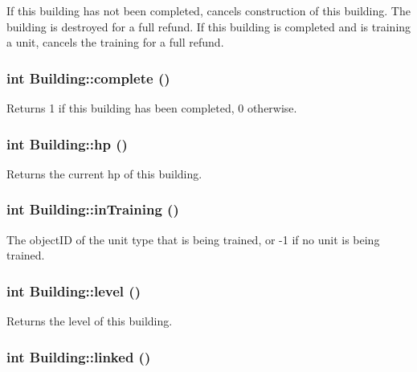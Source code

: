 If this building has not been completed, cancels construction of this building. The building is destroyed for a full refund. If this building is completed and is training a unit, cancels the training for a full refund. \hypertarget{classBuilding_857556a454fae63573429c3de4fcaf31}{
\subsubsection[{complete}]{\setlength{\rightskip}{0pt plus 5cm}int Building::complete ()}}
\label{classBuilding_857556a454fae63573429c3de4fcaf31}


Returns 1 if this building has been completed, 0 otherwise. \hypertarget{classBuilding_48f667674e858a00faf79d46e43335bd}{
\subsubsection[{hp}]{\setlength{\rightskip}{0pt plus 5cm}int Building::hp ()}}
\label{classBuilding_48f667674e858a00faf79d46e43335bd}


Returns the current hp of this building. \hypertarget{classBuilding_a30937bcf69dd4b8f7ce30c4536f1886}{
\subsubsection[{inTraining}]{\setlength{\rightskip}{0pt plus 5cm}int Building::inTraining ()}}
\label{classBuilding_a30937bcf69dd4b8f7ce30c4536f1886}


The objectID of the unit type that is being trained, or -1 if no unit is being trained. \hypertarget{classBuilding_e16eed2b0497af6c2629cf3cb1823c5d}{
\subsubsection[{level}]{\setlength{\rightskip}{0pt plus 5cm}int Building::level ()}}
\label{classBuilding_e16eed2b0497af6c2629cf3cb1823c5d}


Returns the level of this building. \hypertarget{classBuilding_1270e1fa9a9acdca4daf08d39c9a72ac}{
\subsubsection[{linked}]{\setlength{\rightskip}{0pt plus 5cm}int Building::linked ()}}
\label{classBuilding_1270e1fa9a9acdca4daf08d39c9a72ac}


